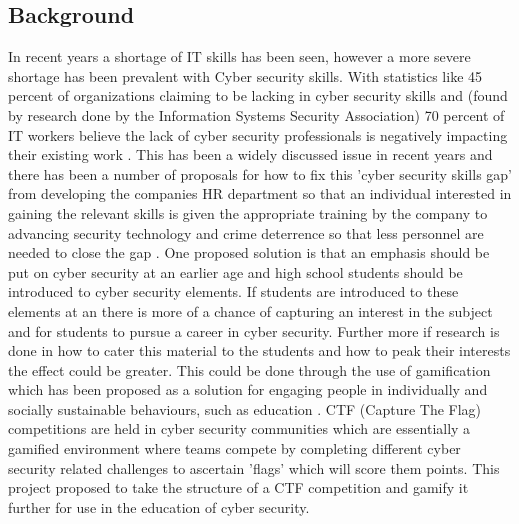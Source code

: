 \documentclass[12pt,a4paper]{article}
\begin{document}
\subsection{Background}  
In recent years a shortage of IT skills has been seen, however a more severe shortage has been prevalent with Cyber security skills. With statistics like 45 percent of organizations claiming to be lacking in cyber security skills and (found by research done by the Information Systems Security Association) 70 percent of IT workers believe the lack of cyber security professionals is negatively impacting their existing work \cite{smith2018intelligent}. This has been a widely discussed issue in recent years and there has been a number of proposals for how to fix this 'cyber security skills gap' from developing the companies HR department so that an individual interested in gaining the relevant skills is given the appropriate training by the company to advancing security technology and crime deterrence so that less personnel are needed to close the gap \cite{cobb2016mind}. One proposed solution is that an emphasis should be put on cyber security at an earlier age and high school students should be introduced to cyber security elements. If students are introduced to these elements at an there is more of a chance of capturing an interest in the subject and for  students to pursue a career in cyber security. Further more if research is done in how to cater this material to the students and how to peak their interests the effect could be greater. This could be done through the use of gamification which has been proposed as a solution for engaging people in individually and socially sustainable behaviours, such as education \cite{su2015mobile}. CTF (Capture The Flag) competitions are held in cyber security communities which are essentially a gamified environment where teams compete by completing different cyber security related challenges to ascertain 'flags' which will score them points. This project proposed to take the structure of a CTF competition and gamify it further for use in the education of cyber security.  
\end{document}
